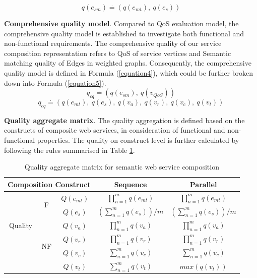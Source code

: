 \documentclass{IEEEtran}
\begin{document}
\begin{equation}
\label{equation3}
q(e_{sm}) \stackrel{.}{=} (q(e_ {mt}), \  q(e_ {s}))
\end{equation}

\textbf{Comprehensive quality model}. Compared to QoS evaluation model, the comprehensive quality model is established to investigate both functional and non-functional requirements. The comprehensive quality of our service composition representation refers to QoS of service vertices and Semantic matching quality of Edges in weighted graphs. Consequently, the comprehensive quality model is defined in Formula (\ref{equation4}), which could be further broken down into Formula (\ref{equation5}). 
\begin{equation}
\label{equation4}
q_{cq} \stackrel{.}{=} (q(e_ {sm}), \  q(v_ {QoS}))
\end{equation}
\begin{equation}
\label{equation5}
q_{cq} \stackrel{.}{=} (q(e_ {mt}), \  q(e_ {s}), \  q(v_{a}),\  q(v_{r}),\  q(v_{c}),\  q(v_{t}))
\end{equation}

\textbf{Quality aggregate matrix}. The quality aggregation is defined based on the constructs of composite web services, in consideration of functional and non-functional properties. The quality on construct level is further calculated by following the rules summarised in Table \ref{table1}. 

\begin{table}[]
\centering
\caption{Quality aggregate matrix for semantic web service composition}
\label{table1}
\begin{tabular}{c|c|c|c|c}
\hline
\multicolumn{3}{c|}{Composition Construct}                                      & Sequence                             & Parallel \\ \hline
\multirow{5}{*}{Quality} & \multirow{2}{*}{F}    & $Q(e_ {mt})$  &$\prod_{n=1}^{m} q(e_ {mt})$          &  $\prod_{n=1}^{m} q(e_ {mt})$ \\ \cline{3-5}
                                &                                & $Q(e_ {s})$  & $(\sum_{n=1}^m q(e_ {s}))/m$        &  $(\sum_{n=1}^m q(e_ {s}))/m$  \\ \cline{2-5}   
                                & \multirow{4}{*}{NF} & $Q(v_{a})$    & $\prod_{n=1}^{m} q(v_a)$             &  $\prod_{n=1}^{m} q(v_a)$ \\ \cline{3-5} 
                                &                                & $Q(v_{r})$    & $\prod_{n=1}^{m} q(v_r)$             &  $\prod_{n=1}^{m} q(v_r)$ \\ \cline{3-5} 
                                &                                & $Q(v_{c})$    & $\sum_{n=1}^m q(v_ {c})$             &  $\sum_{n=1}^m q(v_ {c})$ \\ \cline{3-5} 
                                &                                & $Q(v_{t})$    & $\sum_{n=1}^m q(v_ {t})$             &  $max(q(v_ {t}))$ \\ \hline
\end{tabular}
\end{table}
\end{document}

